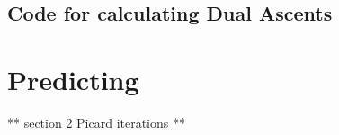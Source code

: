 \documentclass[letterpaper,10pt,english]{sphinxmanual}
\begin{document}
\section{Code for calculating Dual Ascents}
\label{\detokenize{sections/dual_ascents:code-for-calculating-dual-ascents}}\label{\detokenize{sections/dual_ascents:module-utilities.DualAscents}}

\chapter{Predicting}
\label{\detokenize{sections/prediction:predicting}}\label{\detokenize{sections/prediction:prediction}}\label{\detokenize{sections/prediction::doc}}
** section 2 Picard iterations **
\end{document}
